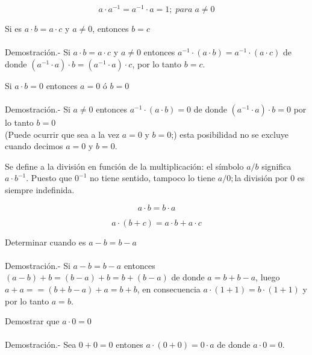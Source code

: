 \begin{prop}
$$a\cdot a^{-1} = a^{-1} \cdot a = 1; \; para \; a\neq 0$$
\end{prop}

\begin{teo}
Si es $a\cdot b = a \cdot c$ y $a\neq 0$, entonces $b=c$\\\\
Demostración.- \; Si $a\cdot b = a\cdot c$ y $a\neq 0$ entonces $a^{-1} \cdot (a \cdot b) = a^{-1} \cdot (a \cdot c)$ de donde $(a^{-1} \cdot a) \cdot b = (a^{-1} \cdot a) \cdot c$, por lo tanto $b=c.$
\end{teo}

\begin{teo}
Si $a\cdot b =0$ entonces $a=0$ ó $b=0$\\\\
Demostración.- \; Si $a\neq 0$ entonces $a^{-1} \cdot (a\cdot b) = 0$ de donde  $(a^{-1} \cdot a) \cdot b =0$ por lo tanto $b=0$\\
(Puede ocurrir que sea a la vez $a=0$ y $b=0$;) esta posibilidad no se excluye cuando decimos $a=0$ y $b=0$. 
\end{teo}

\begin{def.}
Se define a la división en función de la multiplicación: el símbolo $a/b$ significa $a\cdot b^{-1}$. Puesto que $0^{-1}$ no tiene sentido, tampoco lo tiene $a/0;$la división por $0$ es siempre indefinida. 
\end{def.}

\begin{prop} 
$$a\cdot b = b\cdot a$$
\end{prop}

\begin{prop}
$$a\cdot (b+c) = a \cdot b + a \cdot c$$
\end{prop}

\begin{teo}
Determinar cuando es $a-b=b-a$\\\\
Demostración.- \; Si $a-b=b-a$ entonces $(a-b) + b = (b-a) + b = b+ (b-a)$ de donde $a=b+b-a$, luego $a+a = =(b+b-a)+a=b+b$, en consecuencia $a\cdot (1+1)=b\cdot (1+1)$ y por lo tanto $a=b$.
\end{teo}

\begin{teo}
Demostrar que $a\cdot 0 = 0$\\\\
Demostración.- \; Sea $0 + 0 = 0$ entones $a \cdot (0+0) =0 \cdot a$ de donde $a\cdot 0 = 0$.
\end{teo}

